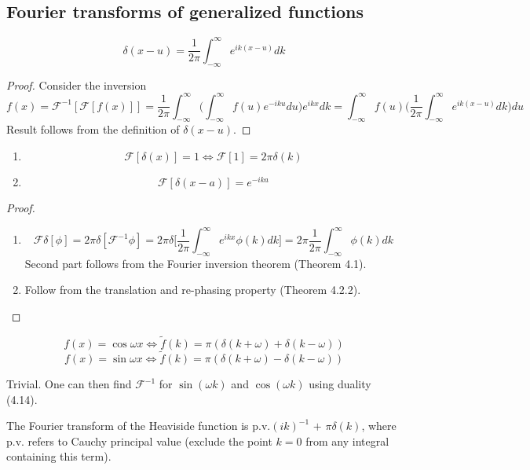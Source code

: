 \documentclass[a4paper]{article}
\begin{document}
\subsection{Fourier transforms of generalized functions}
\begin{prop}
\begin{equation}
    \delta(x-u)=\frac{1}{2\pi}\int_{-\infty}^\infty e^{ik(x-u)}dk\tag{4.21}
\end{equation}
\end{prop}
\begin{proof}
Consider the inversion
$$f(x)=\mathcal{F}^{-1}[\mathcal{F}[f(x)]]=\frac{1}{2\pi}\int_{-\infty}^\infty\bigg(\int_{-\infty}^\infty f(u)e^{-iku}du\bigg)e^{ikx}dk=\int_{-\infty}^\infty f(u)\bigg(\frac{1}{2\pi}\int_{-\infty}^\infty e^{ik(x-u)}dk\bigg)du$$
Result follows from the definition of $\delta(x-u)$.
\end{proof}
\begin{prop}\leavevmode
\begin{enumerate}
    \item 
    \begin{equation}
    \mathcal{F}[\delta(x)]=1\iff\mathcal{F}[1]=2\pi\delta(k)\tag{4.22}
    \end{equation}
    \item
    \begin{equation}
\mathcal{F}[\delta(x-a)]=e^{-ika}\tag{4.23}
    \end{equation}
\end{enumerate}
\end{prop}
\begin{proof}\leavevmode
\begin{enumerate}
    \item $$\mathcal{F}\delta[\phi]=2\pi\delta[\mathcal{F}^{-1}\phi]=2\pi\delta\bigg[\frac{1}{2\pi}\int_{-\infty}^\infty e^{ikx}\phi(k)dk\bigg]=2\pi\frac{1}{2\pi}\int_{-\infty}^\infty\phi(k)dk$$
    Second part follows from the Fourier inversion theorem (Theorem 4.1).
    \item Follow from the translation and re-phasing property (Theorem 4.2.2).
\end{enumerate}
\end{proof}
\begin{cor}
$$f(x)=\cos\omega x\iff\tilde{f}(k)=\pi(\delta(k+\omega)+\delta(k-\omega))$$
$$f(x)=\sin\omega x\iff\tilde{f}(k)=\pi(\delta(k+\omega)-\delta(k-\omega))$$
\end{cor}
Trivial. One can then find $\mathcal{F}^{-1}$ for $\sin(\omega k)$ and $\cos(\omega k)$ using duality (4.14). 
\begin{prop}
The Fourier transform of the Heaviside function is p.v.$(ik)^{-1}$ $+$ $\pi\delta(k)$, where p.v. refers to Cauchy principal value (exclude the point $k=0$ from any integral containing this term).
\end{prop}
\end{document}
